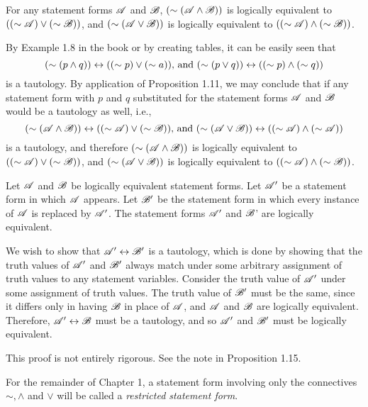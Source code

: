 \begin{proposition}
  For any statement forms \(\mathscr{A}\) and \(\mathscr{B}\), \((\sim (\mathscr{A} \land \mathscr{B}))\) is logically equivalent to \(((\sim \mathscr{A}) \lor (\sim \mathscr{B}))\), and \((\sim (\mathscr{A} \lor \mathscr{B}))\) is logically equivalent to \(((\sim \mathscr{A}) \land (\sim \mathscr{B}))\).

  \prf{} By Example 1.8 in the book or by creating tables, it can be easily seen that
  \[(\sim (p \land q)) \leftrightarrow ((\sim p) \lor (\sim a)) \text{, and } (\sim (p \lor q)) \leftrightarrow ((\sim p) \land (\sim q))\]
  is a tautology. By application of Proposition 1.11, we may conclude that if any statement form with \(p\) and \(q\) substituted for the statement forms \(\mathscr{A}\) and \(\mathscr{B}\) would be a tautology as well, i.e.,
  \[(\sim (\mathscr{A} \land \mathscr{B})) \leftrightarrow ((\sim \mathscr{A}) \lor (\sim \mathscr{B})) \text{, and } (\sim (\mathscr{A} \lor \mathscr{B})) \leftrightarrow ((\sim \mathscr{A}) \land (\sim \mathscr{A}))\]
  is a tautology, and therefore \((\sim (\mathscr{A} \land \mathscr{B}))\) is logically equivalent to \(((\sim \mathscr{A}) \lor (\sim \mathscr{B}))\), and \((\sim (\mathscr{A} \lor \mathscr{B}))\) is logically equivalent to \(((\sim \mathscr{A}) \land (\sim \mathscr{B}))\).
\end{proposition}

\setcounter{definition}{13}
\begin{proposition}
  Let \(\mathscr{A}\) and \(\mathscr{B}\) be logically equivalent statement forms. Let \(\mathscr{A}'\) be a statement form in which \(\mathscr{A}\) appears. Let \(\mathscr{B}'\) be the statement form in which every instance of \(\mathscr{A}\) is replaced by \(\mathscr{A}'\). The statement forms \(\mathscr{A}'\) and \(\mathscr{B}\)' are logically equivalent.

  \prf{} We wish to show that \(\mathscr{A}' \leftrightarrow \mathscr{B}'\) is a tautology, which is done by showing that the truth values of \(\mathscr{A}'\) and \(\mathscr{B}'\) always match under some arbitrary assignment of truth values to any statement variables. Consider the truth value of \(\mathscr{A}'\) under some assignment of truth values. The truth value of \(\mathscr{B}'\) must be the same, since it differs only in having \(\mathscr{B}\) in place of \(\mathscr{A}\), and \(\mathscr{A}\) and \(\mathscr{B}\) are logically equivalent. Therefore, \(\mathscr{A}' \leftrightarrow \mathscr{B}\) must be a tautology, and so \(\mathscr{A}'\) and \(\mathscr{B}'\) must be logically equivalent.

  \note{} This proof is not entirely rigorous. See the note in Proposition 1.15.
\end{proposition}

For the remainder of Chapter 1, a statement form involving only the connectives \(\sim, \land\) and \(\lor\) will be called a \textit{restricted statement form}.

